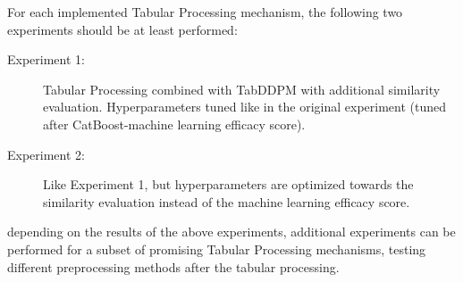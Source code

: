 For each implemented Tabular Processing mechanism, the following two experiments should be at least performed:

\begin{description}
    \item[Experiment 1:] Tabular Processing combined with TabDDPM with additional similarity evaluation. Hyperparameters tuned like in the original experiment (tuned after CatBoost-machine learning efficacy score).
    \item[Experiment 2:] Like Experiment 1, but hyperparameters are optimized towards the similarity evaluation instead of the machine learning efficacy score.
\end{description}

depending on the results of the above experiments, additional experiments can be performed for a subset of promising Tabular Processing mechanisms, \eg testing different preprocessing methods after the tabular processing.

